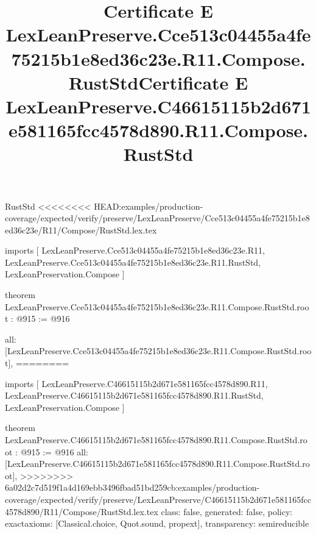 \begin{lexlean}{RustStd}
<<<<<<<< HEAD:examples/production-coverage/expected/verify/preserve/LexLeanPreserve/Cce513c04455a4fe75215b1e8ed36c23e/R11/Compose/RustStd.lex.tex
\title{Certificate E LexLeanPreserve.Cce513c04455a4fe75215b1e8ed36c23e.R11.Compose.RustStd}
\begin{coremodule}
imports [
  LexLeanPreserve.Cce513c04455a4fe75215b1e8ed36c23e.R11,
  LexLeanPreserve.Cce513c04455a4fe75215b1e8ed36c23e.R11.RustStd,
  LexLeanPreservation.Compose
]

theorem LexLeanPreserve.Cce513c04455a4fe75215b1e8ed36c23e.R11.Compose.RustStd.root : @915 := @916 {
  all: [LexLeanPreserve.Cce513c04455a4fe75215b1e8ed36c23e.R11.Compose.RustStd.root],
========
\title{Certificate E LexLeanPreserve.C46615115b2d671e581165fcc4578d890.R11.Compose.RustStd}
\begin{coremodule}
imports [
  LexLeanPreserve.C46615115b2d671e581165fcc4578d890.R11,
  LexLeanPreserve.C46615115b2d671e581165fcc4578d890.R11.RustStd,
  LexLeanPreservation.Compose
]

theorem LexLeanPreserve.C46615115b2d671e581165fcc4578d890.R11.Compose.RustStd.root : @915 := @916 {
  all: [LexLeanPreserve.C46615115b2d671e581165fcc4578d890.R11.Compose.RustStd.root],
>>>>>>>> 6a02d2c7d519f1a4d169ebb3496fbad51bd259cb:examples/production-coverage/expected/verify/preserve/LexLeanPreserve/C46615115b2d671e581165fcc4578d890/R11/Compose/RustStd.lex.tex
  class: false,
  generated: false,
  policy: exact{axioms: [Classical.choice, Quot.sound, propext]},
  transparency: semireducible
}


\end{coremodule}}
\end{coremodule}
\end{lexlean}
